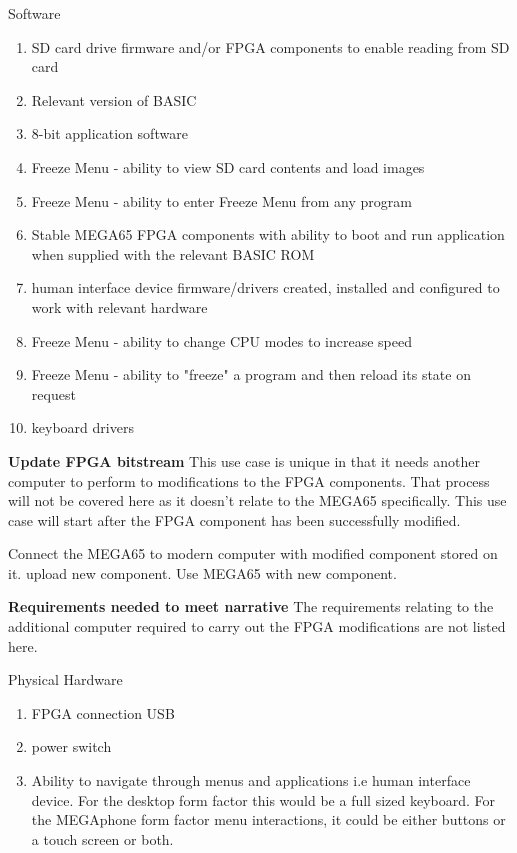 Software
\begin{enumerate}
\item SD card drive firmware and/or FPGA components to enable reading from SD card
\item Relevant version of BASIC 
\item 8-bit application software
\item Freeze Menu - ability to view SD card contents and load images
\item Freeze Menu - ability to enter Freeze Menu from any program
\item Stable MEGA65 FPGA components with ability to boot and run application when supplied with the relevant BASIC ROM
\item human interface device firmware/drivers created, installed and configured to work with relevant hardware
\item Freeze Menu - ability to change CPU modes to increase speed
\item Freeze Menu - ability to "freeze" a program and then reload its state on request
\item keyboard drivers
\end{enumerate}

\textbf{Update FPGA bitstream}
This use case is unique in that it needs another computer to perform to modifications to the FPGA components. That process will not be covered here as it doesn't relate to the MEGA65 specifically. This use case will start after the FPGA component has been successfully modified. 

Connect the MEGA65 to modern computer with modified component stored on it. 
upload new component.
Use MEGA65 with new component.

\textbf{Requirements needed to meet narrative}
The requirements relating to the additional computer required to carry out the FPGA modifications are not listed here.

Physical Hardware
\begin{enumerate}
\item FPGA connection USB
\item power switch
\item Ability to navigate through menus and applications i.e human interface device. For the desktop form factor this would be a full sized keyboard. For the MEGAphone form factor menu interactions, it could be either buttons or a touch screen or both.
\end{enumerate}

